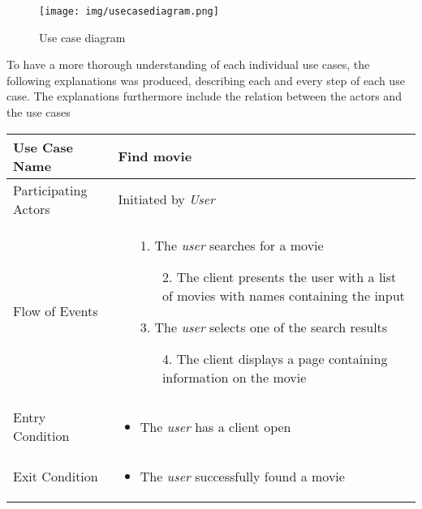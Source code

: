 \begin{figure}[H]
\texttt{[image: img/usecasediagram.png]}
\caption{Use case diagram}
\label{fig:use case diagram}
\end{figure}

To have a more thorough understanding of each individual use cases, the following explanations was produced, describing each and every step of each use case.
The explanations furthermore include the relation between the actors and the use cases


\begin{center}
	\begin{tabular}{ | l | p{10cm} |  }
		 \hline
		Use Case Name & Find movie \\ \hline
		Participating Actors & Initiated by \emph{User} \\ \hline
		Flow of Events & \begin{enumerate}
						\item[1.] The \emph{user} searches for a movie
						\begin{enumerate}
							\item[2.] The client presents the user with a list of movies with names containing the input
						\end{enumerate}
						\item[3.] The \emph{user} selects one of the search results
						\begin{enumerate}
							\item[4.] The client displays a page containing information on the movie
						\end{enumerate}
					\end{enumerate} \\ \hline
		Entry Condition & \begin{itemize}
						\item The \emph{user} has a client open
					\end{itemize} \\ \hline
		Exit Condition & \begin{itemize}
						\item The \emph{user} successfully found a movie
					\end{itemize} \\
		\hline
	\end{tabular}
\end{center}


